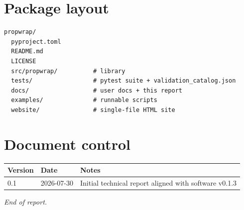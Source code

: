 \documentclass[11pt,a4paper]{report}
\begin{document}
\appendix
\chapter{Package layout}
\begin{verbatim}
propwrap/
  pyproject.toml
  README.md
  LICENSE
  src/propwrap/          # library
  tests/                 # pytest suite + validation_catalog.json
  docs/                  # user docs + this report
  examples/              # runnable scripts
  website/               # single-file HTML site
\end{verbatim}

\chapter{Document control}
\begin{center}
\begin{tabular}{@{}llp{7.5cm}@{}}
\toprule
Version & Date & Notes \\
\midrule
0.1 & 2026-07-30 & Initial technical report aligned with software v0.1.3 \\
\bottomrule
\end{tabular}
\end{center}

\vspace{1em}
\noindent\textit{End of report.}
\end{document}
